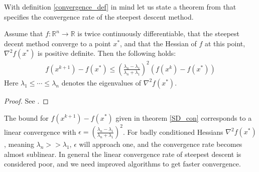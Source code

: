 With definition \ref{convergence_def} in mind let us state a theorem from \cite{nocedal2006numerical} that specifies the convergence rate of the steepest descent method.
\begin{theorem}
\label{SD_con}
Assume that $f:\mathbb{R}^n\longrightarrow\mathbb{R}$ is twice continuously differentiable, that the steepest decent method converge to a point $x^*$, and that the Hessian of $f$ at this point, $\nabla^2 f(x^*)$ is positive definite. Then the following holds:
\begin{align*}
f(x^{k+1})-f(x^*) \leq (\frac{\lambda_n-\lambda_1}{\lambda_n+\lambda_1})^2 (f(x^{k})-f(x^*))
\end{align*}  
Here $\lambda_1\leq\cdots\leq \lambda_n$ denotes the eigenvalues of $\nabla^2 f(x^*)$.
\end{theorem}   
\begin{proof}
See \cite{nocedal2006numerical}.
\end{proof}
\noindent
The bound for $f(x^{k+1})-f(x^*)$ given in theorem \ref{SD_con} corresponds to a linear convergence with $\epsilon=(\frac{\lambda_n-\lambda_1}{\lambda_n+\lambda_1})^2$. For badly conditioned Hessians $\nabla^2 f(x^*)$, meaning $\lambda_n>>\lambda_1$, $\epsilon$ will approach one, and the convergence rate becomes almost sublinear. In general the linear convergence rate of steepest descent is considered poor, and we need improved algorithms to get faster convergence.
